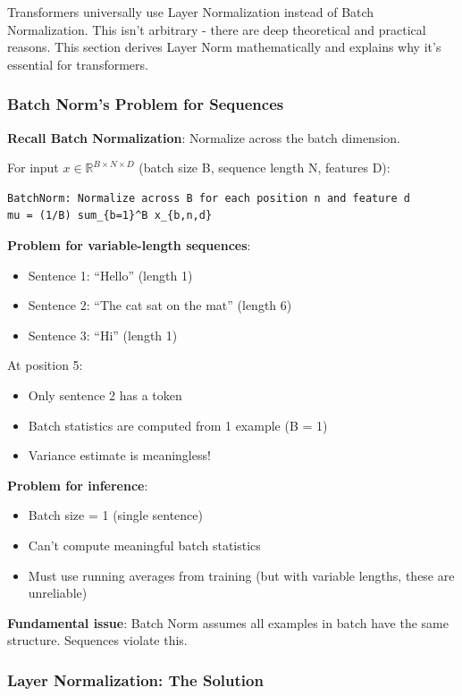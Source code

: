 Transformers universally use Layer Normalization instead of Batch Normalization. This isn't arbitrary - there are deep theoretical and practical reasons. This section derives Layer Norm mathematically and explains why it's essential for transformers.

\subsubsection{Batch Norm's Problem for Sequences}

\textbf{Recall Batch Normalization}: Normalize across the batch dimension.

For input $x \in \mathbb{R}^{B \times N \times D}$ (batch size B, sequence length N, features D):
\begin{verbatim}
BatchNorm: Normalize across B for each position n and feature d
mu = (1/B) sum_{b=1}^B x_{b,n,d}
\end{verbatim}

\textbf{Problem for variable-length sequences}:
\begin{itemize}
\item Sentence 1: ``Hello'' (length 1)
\item Sentence 2: ``The cat sat on the mat'' (length 6)
\item Sentence 3: ``Hi'' (length 1)
\end{itemize}

At position 5:
\begin{itemize}
\item Only sentence 2 has a token
\item Batch statistics are computed from 1 example (B = 1)
\item Variance estimate is meaningless!
\end{itemize}

\textbf{Problem for inference}:
\begin{itemize}
\item Batch size = 1 (single sentence)
\item Can't compute meaningful batch statistics
\item Must use running averages from training (but with variable lengths, these are unreliable)
\end{itemize}

\textbf{Fundamental issue}: Batch Norm assumes all examples in batch have the same structure. Sequences violate this.

\subsubsection{Layer Normalization: The Solution}

